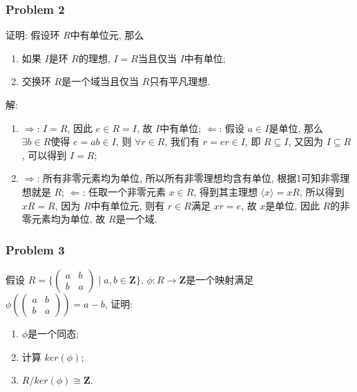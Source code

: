 \documentclass[a4paper,12pt]{ctexart}
\newcommand{\Z}{\mathbf{Z}}
\begin{document}
\subsubsection*{Problem 2}
   证明: 假设环 $ R $中有单位元, 那么
   \begin{enumerate}
      \item 如果 $ I $是环 $ R $的理想, $ I=R $当且仅当 $ I $中有单位;
      \item 交换环 $ R $是一个域当且仅当 $ R $只有平凡理想.
    \end{enumerate}

    解: \begin{enumerate}
      \item $ \Rightarrow $: $ I=R $, 因此 $ e\in R=I $, 故 $ I $中有单位;
      $ \Leftarrow $: 假设 $ a\in I $是单位, 那么 $ \exists b\in R $使得 $ e=ab\in I $, 则 $ \forall r\in R $, 我们有 $ r=er\in I $, 即 $ R\subseteq I $,
      又因为 $ I\subseteq R $, 可以得到 $ I=R $; 
      \item $ \Rightarrow $: 所有非零元素均为单位, 所以所有非零理想均含有单位, 根据1可知非零理想就是 $ R $;
      $ \Leftarrow $: 任取一个非零元素 $ x\in R $, 得到其主理想 $ \langle x \rangle=xR $, 所以得到 $ xR=R $, 因为 $ R $中有单位元, 则有 $ r\in R $满足 $ xr=e $, 
      故 $ x $是单位, 因此 $ R $的非零元素均为单位, 故 $ R $是一个域. 
    \end{enumerate}
\subsubsection*{Problem 3}
    假设 $ R=\{\begin{pmatrix}a&b\\b&a\end{pmatrix}\mid a,b\in\Z\} $, 
    $ \phi:R\rightarrow\Z $是一个映射满足 $ \phi(\begin{pmatrix}a&b\\b&a\end{pmatrix})=a-b $,
    证明:
    \begin{enumerate}
      \item $ \phi $是一个同态;
      \item 计算 $ ker(\phi) $;
      \item $ R/ker(\phi)\cong\Z $. 
    \end{enumerate} 
\end{document}
